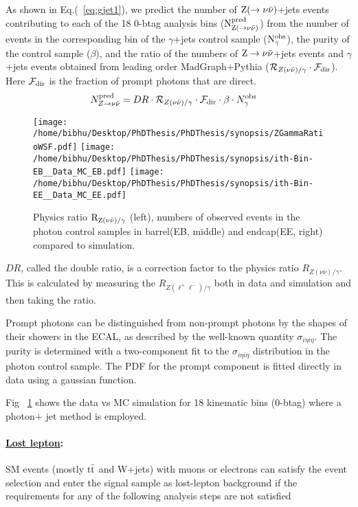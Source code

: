 As shown in Eq.(~\ref{eq:gjet1}), we predict the number of $\rm Z(\to\nu \bar{\nu})$+jets events contributing 
to each of the 18 0-btag analysis bins ($\rm N_{Z(\to\nu \bar{\nu})}^{\rm pred}$) from the number of events in the corresponding 
bin of the $\gamma$+jets control sample ($\rm N_{\gamma}^{\rm obs}$), the purity of the 
control sample ($\beta$), and the ratio of the numbers of $\rm Z\to\nu \bar{\nu}$+jets events and $\gamma$+jets events 
obtained from leading order {\sc MadGraph}+{\sc Pythia} (${\cal
  R}_{Z(\nu\bar{\nu})/\gamma} \cdot {\cal F}_{\rm dir}$).  Here ${\cal
  F}_{\rm dir}$ is the fraction of prompt photons that are direct.
\begin{align}
N_{Z\to\nu \bar{\nu}}^{\rm pred} &= DR\cdot {\cal R}_{Z(\nu\bar{\nu})/\gamma} \cdot {\cal F}_{\rm dir} \cdot \beta \cdot N_{\gamma}^{\rm obs}
\label{eq:gjet1}
\end{align}

\begin{figure}
\begin{center}
\texttt{[image: /home/bibhu/Desktop/PhDThesis/PhDThesis/synopsis/ZGammaRatioWSF.pdf]} %
\texttt{[image: /home/bibhu/Desktop/PhDThesis/PhDThesis/synopsis/ith-Bin-EB\_\_Data\_MC\_EB.pdf]} %
\texttt{[image: /home/bibhu/Desktop/PhDThesis/PhDThesis/synopsis/ith-Bin-EE\_\_Data\_MC\_EE.pdf]} %
\caption{Physics ratio $\rm R_{Z(\nu\bar{\nu})/\gamma}$ (left), numbers of observed events in the photon control samples in barrel(EB, middle) and endcap(EE, right) compared to simulation.}
\label{fig:GJdatavsmc}
\end{center}
\end{figure}
$DR$, called the double ratio, is a correction factor to the physics ratio $R_{Z(\nu\bar{\nu})/\gamma}$. This is calculated by measuring the $R_{Z(\ell^{+}{\ell^{-}})/\gamma}$ both in data and simulation and then taking the ratio.

Prompt photons can be distinguished from non-prompt photons by the shapes of their 
showers in the ECAL, as described by the well-known quantity $\sigma_{i\eta i\eta}$.  
The purity is determined with a two-component fit to the $\sigma_{i\eta i\eta}$ distribution 
in the photon control sample.  The PDF for the prompt component is fitted directly in data
using a gaussian function.

Fig ~\ref{fig:GJdatavsmc} shows the data vs MC simulation for 18 kinematic bins (0-btag) where a  photon$+$ jet method is employed. 
\paragraph{\underline{Lost lepton}: }
SM events (mostly $\rm t\bar{t}$ and W+jets) with muons or electrons
can satisfy the event selection and enter the signal sample as lost-lepton background
if the requirements for any of the following analysis steps are not satisfied

